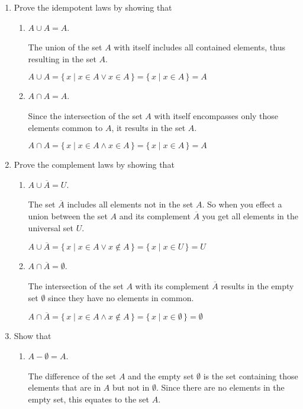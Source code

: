 \documentclass[11pt]{article}
\begin{document}
\begin{enumerate}[label=\textbf{\arabic*.}]
	\item Prove the idempotent laws by showing that
	
	\begin{enumerate}[label=\textbf{\alph*)}]
		\item $A \cup A = A$.
		
		The union of the set $A$ with itself includes all contained elements, thus resulting in the set $A$.
		
		$A \cup A = \{\,x \mid x \in A \lor x \in A\,\} = \{\,x \mid x \in A\,\} = A$
		
		\item $A \cap A = A$.
		
		Since the intersection of the set $A$ with itself encompasses only those elements common to $A$, it results in the set $A$.
		
		$A \cap A = \{\,x \mid x \in A \land x \in A\,\} = \{\,x \mid x \in A\,\} = A$
	\end{enumerate}

	\item Prove the complement laws by showing that
	
	\begin{enumerate}[label=\textbf{\alph*)}]
		\item $A \cup \overline{A} = U$.
		
		The set $\overline{A}$ includes all elements not in the set $A$. So when you effect a union between the set $A$ and its complement $\overline{A}$ you get all elements in the universal set $U$.
		
		$A \cup \overline{A} = \{\,x \mid x \in A \lor x \notin A\,\} = \{\,x \mid x \in U\,\} = U$
		
		\item $A \cap \overline{A} = \emptyset$.
		
		The intersection of the set $A$ with its complement $\overline{A}$ results in the empty set $\emptyset$ since they have no elements in common.
		
		$A \cap \overline{A} = \{\,x \mid x \in A \land x \notin A\,\} = \{\,x \mid x \in \emptyset\,\} = \emptyset$
	\end{enumerate}

	\pagebreak
	\item Show that
	
	\begin{enumerate}[label=\textbf{\alph*)}]
		\item $A - \emptyset = A$.
		
		The difference of the set $A$ and the empty set $\emptyset$ is the set containing those elements that are in $A$ but not in $\emptyset$. Since there are no elements in the empty set, this equates to the set $A$.
		

\end{enumerate}
\end{enumerate}
\end{document}
